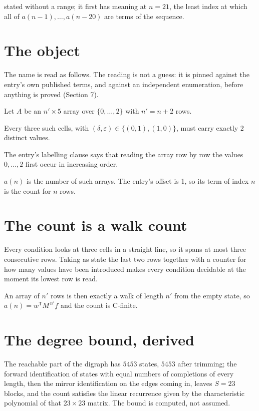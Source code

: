 \documentclass[11pt]{article}
\theoremstyle{definition}
\begin{document}
stated without a range; it first has meaning at $n = 21$, the least index at which all of $a(n-1),\dots,a(n-20)$ are terms of the sequence.

\section{The object}

The name is read as follows. The reading is not a guess: it is pinned against the entry's own published terms, and against an independent enumeration, before anything is proved (Section 7).

Let $A$ be an $n' \times 5$ array over $\{0,\dots,2\}$ with $n' = n + 2$ rows.

Every three such cells, with $(\delta,\varepsilon) \in \{(0,1), (1,0)\}$, must carry exactly $2$ distinct values.

The entry's labelling clause says that reading the array row by row the values $0,\dots,2$ first occur in increasing order.

$a(n)$ is the number of such arrays. The entry's offset is 1, so its term of index $n$ is the count for $n$ rows.

\section{The count is a walk count}

Every condition looks at three cells in a straight line, so it spans at most three consecutive rows. Taking as state the last two rows together with a counter for how many values have been introduced makes every condition decidable at the moment its lowest row is read.

An array of $n'$ rows is then exactly a walk of length $n'$ from the empty state, so $a(n) = w^{\mathsf T}M^{\,n'}f$ and the count is C-finite.

\section{The degree bound, derived}

The reachable part of the digraph has $5453$ states, $5453$ after trimming; the forward identification of states with equal numbers of completions of every length, then the mirror identification on the edges coming in, leaves $S = 23$ blocks, and the count satisfies the linear recurrence given by the characteristic polynomial of that $23\times23$ matrix. The bound is computed, not assumed.
\end{document}
